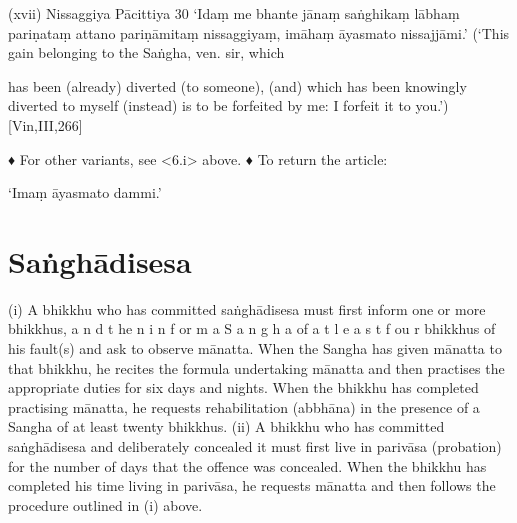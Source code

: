 (xvii) Nissaggiya Pācittiya 30
‘Idaṃ me bhante jānaṃ saṅghikaṃ lābhaṃ
pariṇataṃ attano pariṇāmitaṃ nissaggiyaṃ,
imāhaṃ āyasmato nissajjāmi.’
(‘This gain belonging to the Saṅgha, ven. sir, which

has been (already) diverted (to someone), (and)
which has been knowingly diverted to myself
(instead) is to be forfeited by me: I forfeit it to you.’)
[Vin,III,266]

♦ For other variants, see <6.i> above.
♦ To return the article:

‘Imaṃ āyasmato dammi.’

\section{Saṅghādisesa}

(i) A bhikkhu who has committed saṅghādisesa must first inform one or more bhikkhus,
a n d t he n i n f or m a S a n g h a of a t l e a s t f ou r
bhikkhus of his fault(s) and ask to observe
mānatta. When the Sangha has given mānatta
to that bhikkhu, he recites the formula undertaking mānatta and then practises the
appropriate duties for six days and nights.
When the bhikkhu has completed practising
mānatta, he requests rehabilitation (abbhāna)
in the presence of a Sangha of at least twenty
bhikkhus.
(ii) A bhikkhu who has committed saṅghādisesa and deliberately concealed it must first
live in parivāsa (probation) for the number of
days that the offence was concealed. When
the bhikkhu has completed his time living in
parivāsa, he requests mānatta and then follows the procedure outlined in (i) above.

